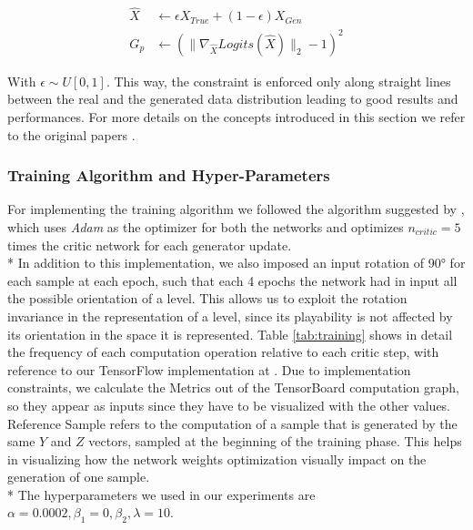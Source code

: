 \begin{equation}
\label{eq:gp}
\begin{split}
\hat{X} & \gets \epsilon X_{True} + (1-\epsilon) X_{Gen} \\
G_p & \gets (\| \nabla_{\hat{X}}Logits(\hat{X}) \|_2 - 1 )^2
\end{split}
\end{equation}

With $ \epsilon \sim U[0,1] $. This way, the constraint is enforced only along straight lines between the real and the generated data distribution leading to good results and performances. For more details on the concepts introduced in this section we refer to the original papers \cite{wgan, wgangp}. 

\subsubsection{Training Algorithm and Hyper-Parameters}
For implementing the training algorithm we followed the algorithm suggested by \cite[alg.~1. p.~4]{wgangp}, which uses \textit{Adam}\cite{adam} as the optimizer for both the networks and optimizes $n_{critic} = 5$ times the critic network for each generator update. \\*
In addition to this implementation, we also imposed an input rotation of 90° for each sample at each epoch, such that each 4 epochs the network had in input all the possible orientation of a level. This allows us to exploit the rotation invariance in the representation of a level, since its playability is not affected by its orientation in the space it is represented. Table \ref{tab:training} shows in detail the frequency of each computation operation relative to each critic step, with reference to our TensorFlow implementation at \cite{gitrepo}. Due to implementation constraints, we calculate the Metrics out of the TensorBoard computation graph, so they appear as inputs since they have to be visualized with the other values. Reference Sample refers to the computation of a sample that is generated by the same $Y$ and $Z$ vectors, sampled at the beginning of the training phase. This helps in visualizing how the network weights optimization visually impact on the generation of one sample. \\*
 The  hyperparameters we used in our experiments are $\alpha=0.0002, \beta_1=0, \beta_2, \lambda=10$.
 


